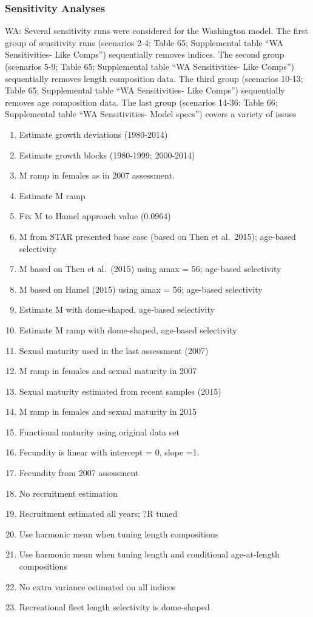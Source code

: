 \documentclass[11pt,
  english,
  letterpaper,
]{article}
\providecommand{\tightlist}{%
  \setlength{\itemsep}{0pt}\setlength{\parskip}{0pt}}
\providecommand{\tightlist}{%
  \setlength{\itemsep}{0pt}\setlength{\parskip}{0pt}}
\begin{document}
\hypertarget{sensitivity-analyses}{%
\subsubsection{Sensitivity Analyses}\label{sensitivity-analyses}}

WA: Several sensitivity runs were considered for the Washington model. The first group of sensitivity runs (scenarios 2-4; Table 65; Supplemental table ``WA Sensitivities- Like Comps'') sequentially removes indices. The second group (scenarios 5-9; Table 65; Supplemental table ``WA Sensitivities- Like Comps'') sequentially removes length composition data. The third group (scenarios 10-13; Table 65; Supplemental table ``WA Sensitivities- Like Comps'') sequentially removes age composition data. The last group (scenarios 14-36: Table 66; Supplemental table ``WA Sensitivities- Model specs'') covers a variety of issues

\begin{enumerate}
\def\labelenumi{\arabic{enumi}.}
\tightlist
\item
  Estimate growth deviations (1980-2014)
\item
  Estimate growth blocks (1980-1999; 2000-2014)
\item
  M ramp in females as in 2007 assessment.
\item
  Estimate M ramp
\item
  Fix M to Hamel approach value (0.0964)
\item
  M from STAR presented base case (based on Then et al.~2015); age-based selectivity
\item
  M based on Then et al.~(2015) using amax = 56; age-based selectivity
\item
  M based on Hamel (2015) using amax = 56; age-based selectivity
\item
  Estimate M with dome-shaped, age-based selectivity
\item
  Estimate M ramp with dome-shaped, age-based selectivity
\item
  Sexual maturity used in the last assessment (2007)
\item
  M ramp in females and sexual maturity in 2007
\item
  Sexual maturity estimated from recent samples (2015)
\item
  M ramp in females and sexual maturity in 2015
\item
  Functional maturity using original data set
\item
  Fecundity is linear with intercept = 0, slope =1.
\item
  Fecundity from 2007 assessment
\item
  No recruitment estimation
\item
  Recruitment estimated all years; ?R tuned
\item
  Use harmonic mean when tuning length compositions
\item
  Use harmonic mean when tuning length and conditional age-at-length compositions
\item
  No extra variance estimated on all indices
\item
  Recreational fleet length selectivity is dome-shaped
\end{enumerate}
\end{document}
